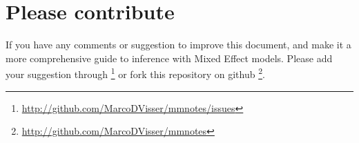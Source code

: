 \documentclass{article}\usepackage[]{graphicx}\usepackage[]{color}
\numberwithin{equation}{section} %
\numberwithin{figure}{section} %
\numberwithin{table}{section} %
\begin{document}
\section{Please contribute}
If you have any comments or suggestion to improve this document, and make it a more comprehensive guide to inference with Mixed Effect models. Please add your suggestion through \footnote{\url{http://github.com/MarcoDVisser/mmnotes/issues}} or fork this repository on github \footnote{\url{http://github.com/MarcoDVisser/mmnotes}}.

    
    
\end{document}
